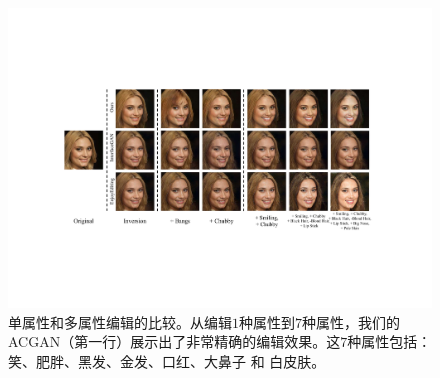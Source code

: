 \begin{figure}[!t]
     \begin{center}
        \includegraphics[width=1\linewidth]{figures/ACGAN/FaceMulti_center.pdf}
     \end{center}
     \caption{单属性和多属性编辑的比较。从编辑$1$种属性到$7$种属性，我们的ACGAN（第一行）展示出了非常精确的编辑效果。这$7$种属性包括：笑、肥胖、黑发、金发、口红、大鼻子 和 白皮肤。}
     \label{fig:face}
\end{figure}

